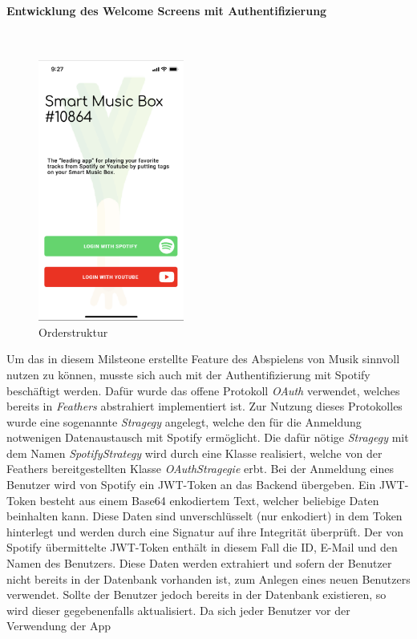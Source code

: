 \documentclass[10pt, a4paper]{article}
\begin{document}
\paragraph*{Entwicklung des Welcome Screens mit Authentifizierung} $~$ \\
\begin{figure}
  \includegraphics[width=4.8cm]{WelcomeScreenV1.png}
  \caption{Orderstruktur}
  \label{fig:Welcome Screen (Version 1)}
\end{figure}
Um das in diesem Milsteone erstellte Feature des Abspielens von Musik sinnvoll nutzen zu können, musste sich auch mit der Authentifizierung mit Spotify beschäftigt
werden. Dafür wurde das offene Protokoll \textit{OAuth} verwendet, welches bereits in \textit{Feathers} abstrahiert implementiert ist. Zur Nutzung dieses
Protokolles wurde eine sogenannte \textit{Stragegy} angelegt, welche den für die Anmeldung notwenigen Datenaustausch mit Spotify ermöglicht.
Die dafür nötige \textit{Stragegy} mit dem Namen \textit{SpotifyStrategy} wird durch eine Klasse realisiert, welche von der Feathers bereitgestellten Klasse
\textit{OAuthStragegie} erbt. Bei der Anmeldung eines Benutzer wird von Spotify ein JWT-Token an das Backend übergeben. Ein JWT-Token besteht aus einem Base64
enkodiertem Text, welcher beliebige Daten beinhalten kann. Diese Daten sind unverschlüsselt (nur enkodiert) in dem Token hinterlegt und werden
durch eine Signatur auf ihre Integrität überprüft. Der von Spotify übermittelte JWT-Token enthält in diesem Fall die ID, E-Mail und den Namen des
Benutzers. Diese Daten werden extrahiert und sofern der Benutzer nicht bereits in der Datenbank vorhanden ist, zum Anlegen eines neuen Benutzers verwendet.
Sollte der Benutzer jedoch bereits in der Datenbank existieren, so wird dieser gegebenenfalls aktualisiert. Da sich jeder Benutzer vor der Verwendung der App
\end{document}
